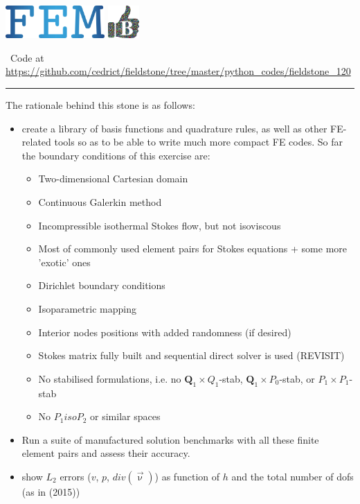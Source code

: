 \includegraphics[height=1.25cm]{images/pictograms/FEM}
\includegraphics[height=1.25cm]{images/pictograms/benchmark}

%

\begin{center}
\inpython~Code at \url{https://github.com/cedrict/fieldstone/tree/master/python_codes/fieldstone_120}
\end{center}

\par\noindent\rule{\textwidth}{0.4pt}



The rationale behind this stone is as follows:
\begin{itemize}
\item create a library of basis functions and quadrature rules, as well as 
other FE-related tools so as to be able to write much more compact FE codes. 
So far the boundary conditions of this exercise are:
\begin{itemize}
\item Two-dimensional Cartesian domain
\item Continuous Galerkin method
\item Incompressible isothermal Stokes flow, but not isoviscous
\item Most of commonly used element pairs for Stokes equations + some more 'exotic' ones 
\item Dirichlet boundary conditions 
\item Isoparametric mapping 
\item Interior nodes positions with added randomness (if desired)
\item Stokes matrix fully built and sequential direct solver is used (REVISIT)
\item No stabilised formulations, i.e. no ${\bm Q}_1\times Q_1$-stab, 
      ${\bm Q}_1\times P_0$-stab, or $P_1\times P_1$-stab
\item No $P_1isoP_2$ or similar spaces
\end{itemize}
\item Run a suite of manufactured solution benchmarks with all 
these finite element pairs and assess their accuracy.
\item show $L_2$ errors ($v$, $p$, $div(\vec\upnu)$) as function of $h$ and the 
total number of dofs (as in \textcite{cakp15} (2015))
\end{itemize}

